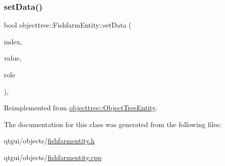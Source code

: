 \subsubsection{\texorpdfstring{setData()}{setData()}}
{\footnotesize\ttfamily bool objecttree\+::\+Fishfarm\+Entity\+::set\+Data (\begin{DoxyParamCaption}\item[{const Q\+Model\+Index \&}]{index,  }\item[{const Q\+Variant \&}]{value,  }\item[{int}]{role }\end{DoxyParamCaption})\hspace{0.3cm}{\ttfamily [override]}, {\ttfamily [virtual]}}



Reimplemented from \mbox{\hyperlink{classobjecttree_1_1_object_tree_entity_ab6742194e637093cb1571998bee88ff5}{objecttree\+::\+Object\+Tree\+Entity}}.



The documentation for this class was generated from the following files\+:\begin{DoxyCompactItemize}
\item 
qtgui/objects/\mbox{\hyperlink{fishfarmentity_8h}{fishfarmentity.\+h}}\item 
qtgui/objects/\mbox{\hyperlink{fishfarmentity_8cpp}{fishfarmentity.\+cpp}}\end{DoxyCompactItemize}
